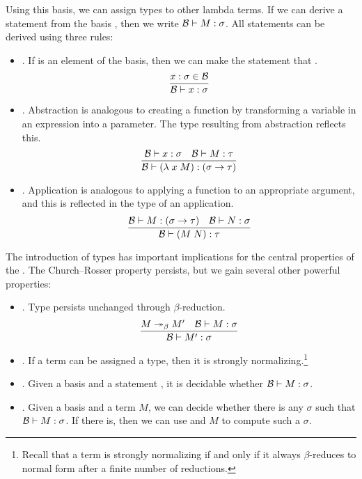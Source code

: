 Using this basis, we can assign types to other lambda terms. If we can derive a statement  from the basis \basis, then we write $\basis \turnstile \stmt{M}{\sigma}$. All statements can be derived using three rules:
\begin{itemize}
\item {}. If  is an element of the basis, then we can make the statement that .
\[
    \frac{\stmt{x}{\sigma} \in \basis}{\basis \turnstile \stmt{x}{\sigma}}
\]

\item {}. Abstraction is analogous to creating a function by transforming a variable in an expression into a parameter. The type resulting from abstraction reflects this.
\[
    \frac{\basis \turnstile \stmt{x}{\sigma}\quad%
        \basis \turnstile \stmt{M}{\tau}}%
    {\basis \turnstile \stmt{(\lambda\; x\; M)}{(\sigma \to \tau)}}
\]

\item {}. Application is analogous to applying a function to an appropriate argument, and this is reflected in the type of an application.
\[
    \frac{\basis \turnstile \stmt{M}{(\sigma \to \tau)}\quad
        \basis \turnstile \stmt{N}{\sigma}}%
    {\basis \turnstile \stmt{(M\; N)}{\tau}}
\]
\end{itemize}

The introduction of types has important implications for the central properties of the \lambdacalc{}. The Church--Rosser property persists, but we gain several other powerful properties:
\begin{itemize}
\item {}. Type persists unchanged through $\beta$-reduction.
\[
\frac{M \betared[*] M\prime \quad \basis \turnstile \stmt{M}{\sigma}}%
{\basis \turnstile \stmt{M\prime}{\sigma}}
\]

\item {}. If a term can be assigned a type, then it is strongly normalizing.\footnote{Recall that a term is strongly normalizing if and only if it always $\beta$-reduces to normal form after a finite number of reductions.}

\item {}. Given a basis \basis{} and a statement , it is decidable whether $\basis \turnstile \stmt{M}{\sigma}$.

\item {}. Given a basis \basis{} and a term $M$, we can decide whether there is any $\sigma$ such that $\basis \turnstile \stmt{M}{\sigma}$. If there is, then we can use \basis{} and $M$ to compute such a $\sigma$.
\end{itemize}


